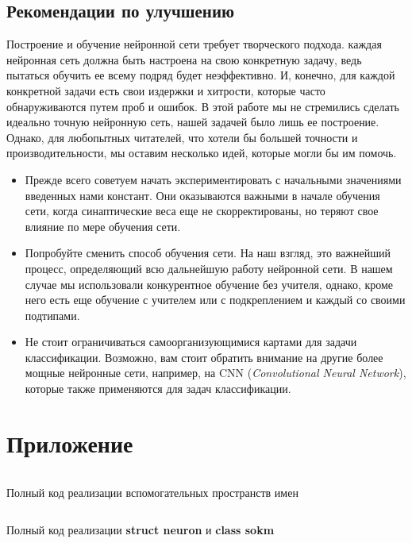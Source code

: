 \documentclass[a4paper,12pt]{report}
\begin{document}
\section{Рекомендации по улучшению}
Построение и обучение нейронной сети требует творческого подхода.
каждая нейронная сеть должна быть настроена на свою конкретную задачу,
ведь пытаться обучить ее всему подряд будет неэффективно. И, конечно,
для каждой конкретной задачи есть свои издержки и хитрости, которые
часто обнаруживаются путем проб и ошибок. В этой
работе мы не стремились сделать идеально точную нейронную сеть, нашей
задачей было лишь ее построение. Однако, для любопытных читателей, что
хотели бы большей точности и производительности, мы оставим несколько
идей, которые могли бы им помочь.
\begin{itemize}
    \item Прежде всего советуем начать экспериментировать с начальными
        значениями введенных нами констант. Они оказываются важными
        в начале обучения сети, когда синаптические
        веса еще не скорректированы, но теряют свое влияние по мере
        обучения сети.
    \item Попробуйте сменить способ обучения сети. На наш взгляд, это
        важнейший процесс, определяющий всю дальнейшую работу
        нейронной сети. В нашем случае мы использовали конкурентное
        обучение без учителя, однако, кроме него есть еще обучение с
        учителем или с подкреплением и каждый со своими подтипами.
    \item Не стоит ограничиваться самоорганизующимися картами для
        задачи классификации. Возможно, вам стоит обратить внимание на
        другие более мощные нейронные сети, например, на CNN
        (\textit{Convolutional Neural Network}), которые также
        применяются для задач классификации.
\end{itemize}

\chapter{Приложение} \label{sec:appendix}

\begin{code}
    \inputminted{cpp}{code/utils.hpp}
    \caption{Полный код реализации вспомогательных пространств имен}
    \label{code:full_utils}
\end{code}
\vspace{5mm}

\begin{code}
    \inputminted{cpp}{code/sokm.hpp}
    \caption{Полный код реализации \textbf{struct neuron} и \textbf{class sokm}}
    \label{code:full_sokm}
\end{code}
\vspace{5mm}
\end{document}
